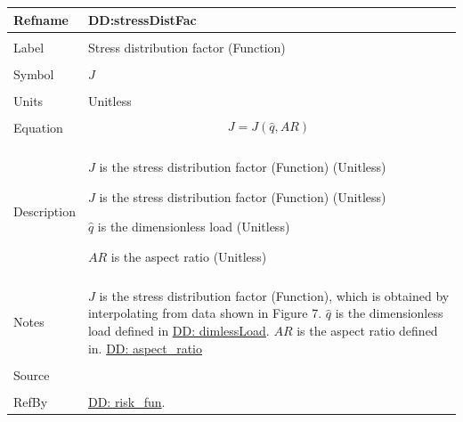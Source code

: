 \documentclass[12pt]{article}
\begin{document}
\noindent \begin{minipage}{\textwidth}
\begin{tabular}{p{} p{}}
\toprule \textbf{Refname} & \textbf{DD:stressDistFac}
\label{DD:stressDistFac}
\\ \midrule \\
Label & Stress distribution factor (Function)
\\ \midrule \\
Symbol & $J$
\\ \midrule \\
Units & Unitless
\\ \midrule \\
Equation & \begin{dmath}
           J=J\left(\hat{q},AR\right)
           \end{dmath}
\\ \midrule \\
Description & \begin{symbDescription}
              \item{$J$ is the stress distribution factor (Function) (Unitless)}
              \item{$J$ is the stress distribution factor (Function) (Unitless)}
              \item{$\hat{q}$ is the dimensionless load (Unitless)}
              \item{$AR$ is the aspect ratio (Unitless)}
              \end{symbDescription}
\\ \midrule \\
Notes & $J$ is the stress distribution factor (Function), which is obtained by interpolating from data shown in Figure 7.
        $\hat{q}$ is the dimensionless load defined in \hyperref[DD:dimlessLoad]{DD: dimlessLoad}.
        $AR$ is the aspect ratio defined in. \hyperref[DD:aspect.ratio]{DD: aspect\_ratio}
\\ \midrule \\
Source & \cite{astm2009}
\\ \midrule \\
RefBy & \hyperref[DD:risk.fun]{DD: risk\_fun}.
\\ \bottomrule \end{tabular}
\end{minipage}\\
~\newline
\end{document}
